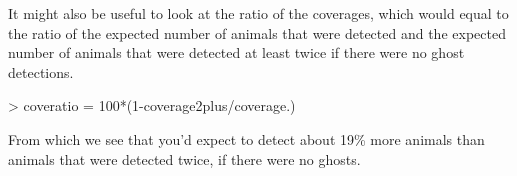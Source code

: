 \documentclass{article}
\begin{document}
It might also be useful to look at the ratio of the coverages, which would equal to the ratio of the expected number of animals that were detected and the expected number of animals that were detected at least twice if there were no ghost detections.

\begin{Schunk}
\begin{Sinput}
> coveratio = 100*(1-coverage2plus/coverage.)
\end{Sinput}
\end{Schunk}

From which we see that you'd expect to detect about 19\% more animals than animals that were detected twice, if there were no ghosts.
\end{document}
